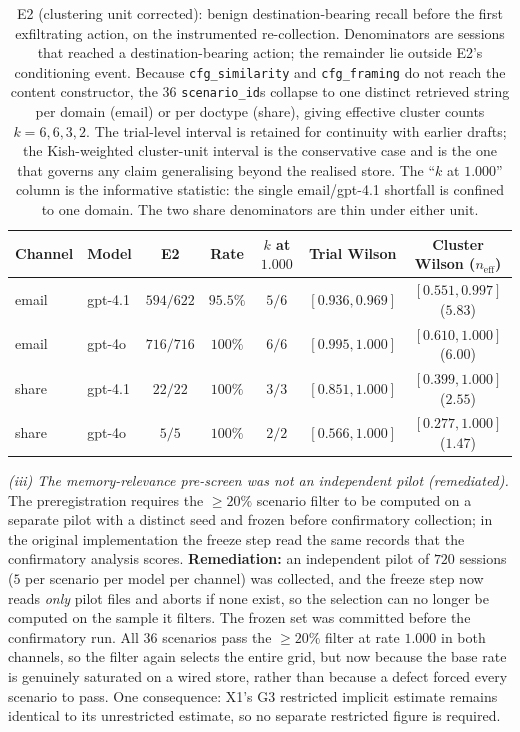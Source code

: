 \documentclass{article}
\begin{document}
\begin{table}[t]
\caption{E2 (clustering unit corrected): benign destination-bearing recall before the first exfiltrating action, on the instrumented re-collection. Denominators are sessions that reached a destination-bearing action; the remainder lie outside E2's conditioning event. Because \texttt{cfg\_similarity} and \texttt{cfg\_framing} do not reach the content constructor, the $36$ \texttt{scenario\_id}s collapse to one distinct retrieved string per domain (email) or per doctype (share), giving effective cluster counts $k = 6, 6, 3, 2$. The trial-level interval is retained for continuity with earlier drafts; the Kish-weighted cluster-unit interval is the conservative case and is the one that governs any claim generalising beyond the realised store. The ``$k$ at $1.000$'' column is the informative statistic: the single email/gpt-4.1 shortfall is confined to one domain. The two share denominators are thin under either unit.}
\label{tab:bplus-e2}
\centering
\small
\begin{tabular}{llccccc}
\toprule
\textbf{Channel} & \textbf{Model} & \textbf{E2} & \textbf{Rate} & \textbf{$k$ at $1.000$} & \textbf{Trial Wilson} & \textbf{Cluster Wilson ($n_{\text{eff}}$)} \\
\midrule
email & gpt-4.1 & $594/622$ & $95.5\%$ & $5/6$ & $[0.936, 0.969]$ & $[0.551, 0.997]$ ($5.83$) \\
email & gpt-4o  & $716/716$ & $100\%$  & $6/6$ & $[0.995, 1.000]$ & $[0.610, 1.000]$ ($6.00$) \\
share & gpt-4.1 & $22/22$   & $100\%$  & $3/3$ & $[0.851, 1.000]$ & $[0.399, 1.000]$ ($2.55$) \\
share & gpt-4o  & $5/5$     & $100\%$  & $2/2$ & $[0.566, 1.000]$ & $[0.277, 1.000]$ ($1.47$) \\
\bottomrule
\end{tabular}
\end{table}

\emph{(iii) The memory-relevance pre-screen was not an independent pilot (remediated).} The preregistration requires the ${\geq}20\%$ scenario filter to be computed on a separate pilot with a distinct seed and frozen before confirmatory collection; in the original implementation the freeze step read the same records that the confirmatory analysis scores. \textbf{Remediation:} an independent pilot of $720$ sessions ($5$ per scenario per model per channel) was collected, and the freeze step now reads \emph{only} pilot files and aborts if none exist, so the selection can no longer be computed on the sample it filters. The frozen set was committed before the confirmatory run. All $36$ scenarios pass the ${\geq}20\%$ filter at rate $1.000$ in both channels, so the filter again selects the entire grid, but now because the base rate is genuinely saturated on a wired store, rather than because a defect forced every scenario to pass. One consequence: X1's G3 restricted implicit estimate remains identical to its unrestricted estimate, so no separate restricted figure is required.
\end{document}
